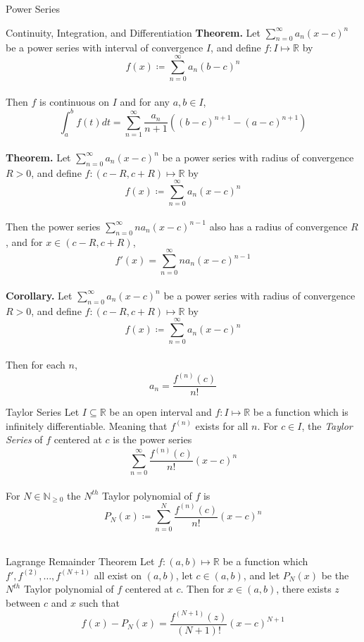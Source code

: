 \documentclass{article}
\newcommand{\real}{\mathbb{R}}
\begin{document}
\begin{multicols*}{3}
\begin{blackbox}{Power Series}
\end{blackbox}
\begin{blackbox}{Continuity, Integration, and Differentiation}
    \textbf{Theorem.} Let  $\sum\limits_{n=0}^\infty a_n(x-c)^n$ be a power series with interval of convergence $I$, and define $f: I \mapsto \real$ by \\[-2ex]
    \[f(x) \coloneqq  \sum_{n=0}^\infty a_n(b-c)^n\]\\[-0.5ex]
    Then $f$ is continuous on $I$ and for any $a,b \in I$, \\[-2ex]
    \[\int_a^b f(t)dt = \sum_{n=1}^\infty \frac{a_n}{n+1}\left((b-c)^{n+1} - (a-c)^{n+1}\right)\]\\[-1ex]
    \textbf{Theorem.} Let  $\sum\limits_{n=0}^\infty a_n(x-c)^n$ be a power series with radius of convergence  $R > 0$, and define $f: (c - R, c + R) \mapsto \real$ by \\[-2ex]
    \[f(x) \coloneqq  \sum_{n=0}^\infty a_n(x-c)^n\]\\[-1ex]
    Then the power series $\sum_{n=0}^\infty na_n(x-c)^{n-1}$ also has a radius of convergence $R$, and for $x \in (c- R, c+ R)$, \\[-2ex]
    \[f'(x) = \sum_{n=0}^\infty na_n (x-c)^{n-1}\]\\[-2ex]
    \textbf{Corollary.} Let $\sum\limits_{n=0}^\infty a_n(x-c)^n$ be a power series with radius of convergence $R > 0$, and define $f: ( c - R, c + R) \mapsto \real$ by \\[-2ex]
   \[f(x) \coloneqq  \sum_{n=0}^\infty a_n(x-c)^n\]\\[-2ex]
   Then for each $n$, \\[-3ex]
   \[a_n = \frac{f^{(n)}(c)}{n!}\]
\end{blackbox}
\begin{blackbox}{Taylor Series}
    Let $I \subseteq \real$ be an open interval and $f: I \mapsto \real$ be a function which is infinitely differentiable. Meaning that $f^{(n)}$ exists for all $n$. For $c \in I$, the \emph{Taylor Series} of $f$ centered at $c$ is the power series\\[-0.6ex]
    \[\sum_{n=0}^\infty \frac{f^{(n)}(c)}{n!}(x-c)^n\]\\[-1ex]
    For $N \in \mathbb{N}_{\geq0}$ the $N^{th}$ Taylor polynomial of $f$ is \\[-1ex]
    \[P_N(x) \coloneqq \sum_{n=0}^N \frac{f^{(n)}(c)}{n!}(x-c)^n\]\\[-1ex]
\begin{bluebox}{Lagrange Remainder Theorem}
    Let $f: (a,b) \mapsto \real$ be a function which $f', f^{(2)},\ldots, f^{(N+1)}$ all exist on $(a,b)$, let $c \in (a,b)$, and let $P_N(x)$ be the $N^{th}$ Taylor polynomial of $f$ centered at $c$. Then for $x \in (a,b)$, there exists $z$ between $c$ and $x$ such that \\[-1ex]
    \[f(x) - P_N(x) = \frac{f^{(N+1)}(z)}{(N+1)!} (x-c)^{N+1}\]\\[-6ex]
\end{bluebox}\\[-2ex]
\end{blackbox}
\end{multicols*}
\end{document}
